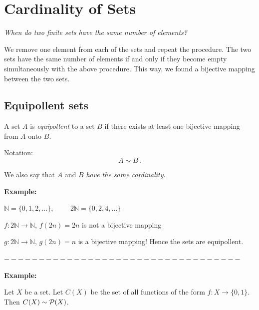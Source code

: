 \documentclass[11pt,paper=b5,footinclude,headinclude]{scrbook} %
\theoremstyle{remark}
\theoremstyle{definition} %
\theoremstyle{theorem} %
\begin{document}
\chapter{Cardinality of Sets}
{\em When do two finite sets have the same number of elements?

We remove one element from each of the sets and repeat the procedure.
The two sets have the same number of elements if and only if they become empty simultaneously with the above procedure.
This way, we found a bijective mapping between the two sets.}

\section{Equipollent sets}

A set $A$ is {\em equipollent} to a set $B$ if there exists at least one bijective mapping from $A$ onto $B$.

Notation: $$A\sim B\,.$$

We also say that $A$ and $B$ \emph{ have the same cardinality}.



\textbf{ Example:}

$\mathbb{N} = \{0,1,2,\ldots\}$,~~~~~$2\mathbb{N} = \{0,2,4,\ldots\}$

$f: 2\mathbb{N} \to \mathbb{N}$, $f(2n) = 2n$ is not a bijective mapping

$g: 2\mathbb{N} \to \mathbb{N}$, $g(2n) = n$ is a bijective mapping!
Hence the sets are equipollent.


\bigskip
$----------------------------------$
\bigskip

\textbf{ Example:}

Let $X$ be a set.
Let $C(X)$ be the set of all functions of the form $f: X\to \{0,1\}$.
Then $C(X)\sim {\cal P}(X)$.
\end{document}
